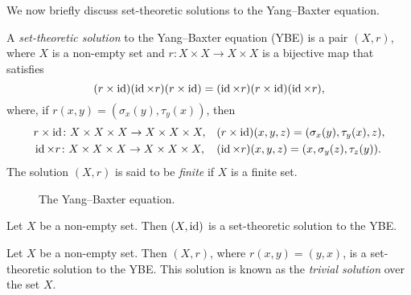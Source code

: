 \chapter{}


We now briefly discuss set-theoretic solutions to the Yang--Baxter equation. 

\begin{definition}
A \emph{set-theoretic solution} to the Yang--Baxter equation (YBE) is a pair $(X,r)$, 
where $X$ is a non-empty set and $r\colon X\times X\to X\times X$ is a bijective map that satisfies 
\[
(r\times\operatorname{id})(\operatorname{id}\times r)(r\times\operatorname{id})=
(\operatorname{id}\times r)(r\times\operatorname{id})(\operatorname{id}\times r),
\]
where, if $r(x,y)=(\sigma_x(y),\tau_y(x))$, then 
\begin{align*}
& r\times\operatorname{id}\colon X\times X\times X\to X\times X\times X, &&(r\times\operatorname{id})(x,y,z)=(\sigma_x(y),\tau_y(x),z),\\
& \operatorname{id}\times r\colon X\times X\times X\to X\times X\times X, &&(\operatorname{id}\times r)(x,y,z)=(x,\sigma_y(z),\tau_z(y)).
\end{align*}
The solution $(X,r)$ is said to be \emph{finite} if $X$ is a finite set. 
\end{definition}

\begin{figure}
\centering
{}
\hspace{1cm}
\caption{The Yang--Baxter equation.}
\label{fig:braid}
\end{figure}


\begin{example}
Let $X$ be a non-empty set. Then $(X,\operatorname{id})$ is a set-theoretic 
solution to the YBE. 	
\end{example}

\begin{example}
Let $X$ be a non-empty set. Then $(X,r)$, where $r(x,y)=(y,x)$, is a  set-theoretic solution to the YBE. This solution 
is known as the \emph{trivial solution} over the set $X$. 
\end{example}

